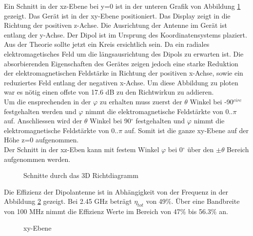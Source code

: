 Ein Schnitt in der xz-Ebene bei y=0 ist in der unteren Grafik von Abbildung \ref{fig:Schnittgemessen} gezeigt. Das Gerät ist in der xy-Ebene positioniert. Das Display zeigt in die Richtung der positiven z-Achse. Die Ausrichtung der Antenne im Gerät ist entlang der y-Achse. Der Dipol ist im Ursprung des Koordinatensystems plaziert. Aus der Theorie sollte jetzt ein Kreis ersichtlich sein. Da ein radiales elektromagetisches Feld um die längsausrichtung des Dipols zu erwarten ist. Die absorbierenden Eigenschaften des Gerätes zeigen jedoch eine starke Reduktion der elektromagnetischen Feldstärke in Richtung der positiven x-Achse, sowie ein reduziertes Feld entlang der negativen x-Achse. Um diese Abbildung zu ploten war es nötig einen offste von 17.6 dB zu den Richtwirkun zu addieren.\\
Um die ensprechenden in der $\varphi$ zu erhalten muss zuerst der $\theta$ Winkel bei -90$^{circ}$ festgehalten werden und $\varphi$ nimmt die elektromagnetische Feldstärkte von $0..\pi$ auf. Anschliessen wird der $\theta$ Winkel bei 90$^{\circ}$ festgehalten  und $\varphi$ nimmt die elektromagnetische Feldstärkte von $0..\pi$ auf. Somit ist die ganze xy-Ebene auf der Höhe z=0 aufgenommen.\\
Der Schnitt in der xz-Eben kann mit festem Winkel $\varphi$ bei 0$^{\circ}$ über den  $\pm \theta$ Bereich aufgenommen werden.
\begin{figure}[!h]
	\centering
	\begingroup
	
	\endgroup
	\caption{Schnitte durch das 3D Richtdiagramm}
	\label{fig:Schnittgemessen}
\end{figure}
\newpage
Die Effizienz der Dipolantenne ist in Abhängigkeit von der Frequenz in der Abbildung \ref{fig:Effizienz_gemessen} gezeigt. Bei 2.45 GHz beträgt $\eta_{tot}$ von 49$\%$. Über eine Bandbreite von 100 MHz nimmt die Effizienz Werte im Bereich von 47$\%$ bis 56.3$\%$ an.\\
\begin{figure}[!h]
	\centering
	\begingroup
	
	\endgroup
	\caption{xy-Ebene}\label{fig:Effizienz_gemessen}
\end{figure}



